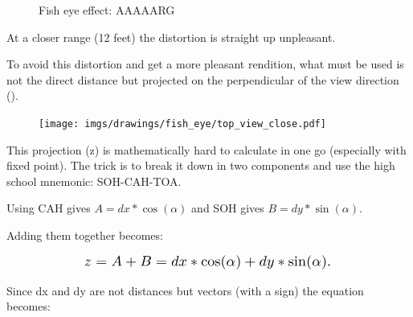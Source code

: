  \begin{figure}[H]
\centering
 \caption{Fish eye effect: AAAAARG} \label{fig:mips}
 \end{figure}
 

\begin{minipage}{.4\textwidth}
At a closer range (12 feet) the distortion is straight up unpleasant.\\
\par
To avoid this distortion and get a more pleasant rendition, what must be used is not the direct distance  but  projected on the perpendicular of the view direction ().
 \end{minipage}
\begin{minipage}{.6\textwidth}
 \begin{figure}[H]
  \begin{flushright}
  \texttt{[image: imgs/drawings/fish\_eye/top\_view\_close.pdf]}
 \end{flushright}
\end{figure}
 \end{minipage}

\par



\begin{figure}[H]

 
\label{fig:Raycasting2}
 
\end{figure}

This projection (z) is mathematically hard to calculate in one go (especially with fixed point). The trick is to break it down in two components and use the high school mnemonic: SOH-CAH-TOA.\\


\begin{figure}[H]
\centering
 
 
\end{figure}
Using CAH gives $A = dx * \cos(\alpha)$ and SOH gives $B = dy * \sin(\alpha) $.\\
\par

Adding them together becomes:
\par
\begin{figure}[H]
  \centering
  \begin{equation*}
    \scalebox{1.3}{
$z = A + B = dx * \cos(\alpha) + dy * \sin(\alpha) $. 
 }
  \end{equation*}
\end{figure}
Since dx and dy are not distances but vectors (with a sign) the equation becomes: 


